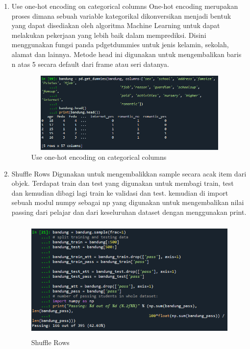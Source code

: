 \begin{enumerate}
\item Use one-hot encoding on categorical columns 
\newline One-hot encoding merupakan proses dimana sebuah variable kategorikal dikonversikan menjadi bentuk yang dapat disediakan oleh algoritma Machine Learning untuk dapat melakukan pekerjaan yang lebih baik dalam memprediksi. Disini menggunakan fungsi panda pdgetdummies untuk jenis kelamin, sekolah, alamat dan lainnya. Metode head ini digunakan untuk mengembalikan baris n atas 5 secara default dari frame atau seri datanya.
\begin{figure}[!htbp]
	\centering
	\includegraphics[width=12cm,height=4cm]{figures/one_hot.png}
	\caption{Use one-hot encoding on categorical columns}
	\label{penanda}
\end{figure}

\item Shuffle Rows
\newline Digunakan untuk mengembalikkan sample secara acak item dari objek. Terdapat train dan test yang digunakan untuk membagi train, test dan kemudian dibagi lagi train ke validasi dan test. kemudian di import sebuah modul numpy sebagai np yang digunakan untuk mengembalikan nilai passing dari pelajar dan dari keseluruhan dataset dengan menggunakan print.
\begin{figure}[!htbp]
	\centering
	\includegraphics[width=12cm,height=6cm]{figures/shuffle_rows.png}
	\caption{Shuffle Rows}
	\label{penanda}
\end{figure}


\end{enumerate}
